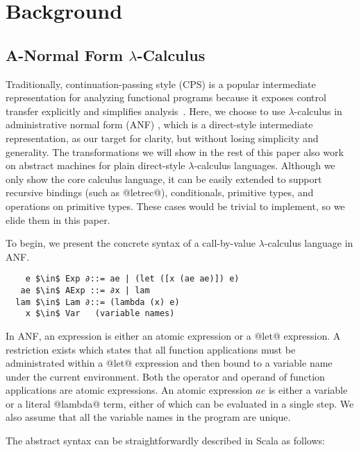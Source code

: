 \documentclass[acmsmall,review,anonymous]{acmart}\settopmatter{printfolios=true,printccs=false,printacmref=false}
\begin{document}
\section{Background} \label{background}

\subsection{A-Normal Form $\lambda$-Calculus} \label{anfsyntax}

Traditionally, continuation-passing style (CPS) is a popular intermediate representation
for analyzing functional programs because it exposes control transfer explicitly
and simplifies analysis~\cite{Shivers:1991:SSC:115865.115884, Shivers:1988:CFA:53990.54007}.
Here, we choose to use $\lambda$-calculus in administrative normal form (ANF) \cite{flanagan1993essence},
which is a direct-style intermediate representation, as our target for clarity,
but without losing simplicity and generality.
The transformations we will show in the rest of this paper
also work on abstract machines for plain direct-style $\lambda$-calculus languages.
Although we only show the core calculus language, it can be easily extended
to support recursive bindings (such as @letrec@), conditionals, primitive types, and
operations on primitive types. These cases would be trivial to implement,
so we elide them in this paper.

To begin, we present the concrete syntax of a call-by-value $\lambda$-calculus language
in ANF.

\begin{lstlisting}
    e $\in$ Exp ∂::= ae | (let ([x (ae ae)]) e)
   ae $\in$ AExp ::= ∂x | lam
  lam $\in$ Lam ∂::= (lambda (x) e)
    x $\in$ Var   (variable names)
\end{lstlisting}

In ANF, an expression is either an atomic expression or a @let@ expression.
A restriction exists which states that all function applications must be administrated
within a @let@ expression and then bound to a variable name under the current environment.
Both the operator and operand of function applications are atomic expressions.
An atomic expression $ae$ is either a variable or a literal @lambda@ term, either of which
can be evaluated in a single step.
We also assume that all the variable names in the program are unique.

The abstract syntax can be straightforwardly described in Scala as follows:
\end{document}
